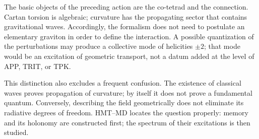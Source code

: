 The basic objects of the preceding action are the co-tetrad and the connection.
Cartan torsion is algebraic; curvature has the propagating sector that
contains gravitational waves. Accordingly, the formalism does not need to
postulate an elementary graviton in order to define the interaction. A possible
quantization of the perturbations may produce a collective mode of
helicities \(\pm2\); that mode would be an excitation of geometric
transport, not a datum added at the level of APP, TRIT, or TPK.

This distinction also excludes a frequent confusion. The existence of
classical waves proves propagation of curvature; by itself it does not prove
a fundamental quantum. Conversely, describing the field geometrically does not
eliminate its radiative degrees of freedom. HMT--MD locates the question properly:
memory and its holonomy are constructed first; the spectrum of their excitations
is then studied.
